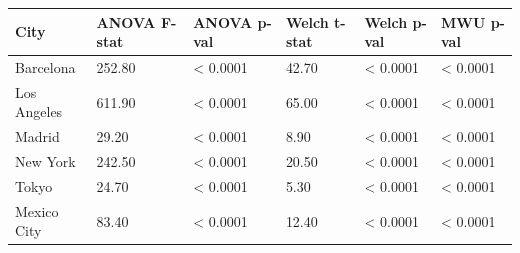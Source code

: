 \begin{tabular}{llllll}
\toprule
City & ANOVA F-stat & ANOVA p-val & Welch t-stat & Welch p-val & MWU p-val \\
\midrule
Barcelona & 252.80 & < 0.0001 & 42.70 & < 0.0001 & < 0.0001 \\
Los Angeles & 611.90 & < 0.0001 & 65.00 & < 0.0001 & < 0.0001 \\
Madrid & 29.20 & < 0.0001 & 8.90 & < 0.0001 & < 0.0001 \\
New York & 242.50 & < 0.0001 & 20.50 & < 0.0001 & < 0.0001 \\
Tokyo & 24.70 & < 0.0001 & 5.30 & < 0.0001 & < 0.0001 \\
Mexico City & 83.40 & < 0.0001 & 12.40 & < 0.0001 & < 0.0001 \\
\bottomrule
\end{tabular}
